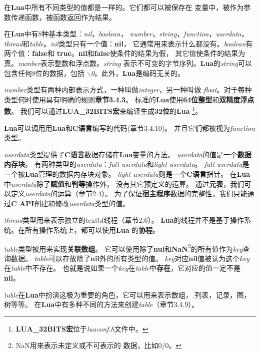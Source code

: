 \documentclass{ctexart}
\begin{document}
在\textbf{Lua}中所有不同类型的值都是一样的。它们都可以被保存在
变量中，被作为参数传递函数，被函数返回作为结果。

在\textbf{Lua}中有8种基本类型：\emph{nil}，\emph{boolean}，
\emph{number}，\emph{string}，\emph{function}，\emph{userdata}，
\emph{thread}和\emph{table}。\emph{nil}类型只有一个值：\textbf{nil}，
它通常用来表示什么都没有。\emph{boolean}有两个值：\textbf{false}和
\textbf{true}。\textbf{nil}和\textbf{false}使条件的结果为假，
其它值使条件的结果为真。\emph{number}表示整数和浮点数。\emph{string}
表示不可变的字节序列。\textbf{Lua}的\emph{string}可以包含任何8位的数据，包括
\emph{$\backslash$0}。此外，\textbf{Lua}是编码无关的。

\emph{number}类型有两种内部表示方式，一种叫做\emph{integer}，另一种叫做
\emph{float}。对于每种类型何时使用具有明确的规则\textbf{章节3.4.3}。
标准的\textbf{Lua}使用\textbf{64位整型}和\textbf{双精度浮点数}。
我们可以通过\textbf{LUA\_32BITS宏}来编译生成\textbf{32位}的\textbf{Lua}
\footnote{\textbf{LUA\_32BITS宏}位于\emph{luaconf.h}文件中。}。

\textbf{Lua}可以调用用\textbf{Lua}和\textbf{C语言}编写的代码(章节3.4.10)。
并且它们都被视为\emph{function}类型。

\emph{userdata}类型提供了\textbf{C语言}数据存储在\textbf{Lua}变量的方法。
\emph{userdata}的值是一个\textbf{数据内存块}。
有两种类型的\emph{userdata}：\emph{full userdata}和\emph{light userdata}。
\emph{full userdata}是一个被\textbf{Lua}管理的数据内存块对象。
\emph{light userdata}则是一个\textbf{C语言}指针。
在\textbf{Lua}中\emph{userdata}除了\textbf{赋值}和\textbf{判等}操作外，
没有其它预定义的运算。
通过\textbf{元表}，我们可以定义\emph{userdata}的运算（章节2.4）。
为了保证\textbf{宿主程序}数据的完整性，我们只能通过\textbf{C API}创建和修改\emph{userdata}类型的值。

\emph{thread}类型用来表示独立的textbf{线程}（章节2.6）。
\textbf{Lua}的线程并不是基于操作系统。在所有操作系统上，都可以使用\textbf{Lua}
的\textbf{协程}。

\emph{table}类型被用来实现\textbf{关联数组}。
它可以使用除了\textbf{nul}和\textbf{NaN}\footnote{NaN用来表示未定义或不可表示的
数据，比如$0/0$。}的所有值作为\emph{key}查询数据。
\emph{table}可以存放除了\textbf{nil}外的所有类型的值。
\emph{key}对应\textbf{nil}值被认为这个\emph{key}在\emph{table}中不存在。
也就是说如果一个\emph{key}在\emph{table}中\textbf{存在}，它对应的值一定不是
\textbf{nil}。

\emph{table}在\textbf{Lua}中扮演这极为重要的角色，它可以用来表示数组，
列表，记录，图，树等等。
在\textbf{Lua}中有多种不同的方法来创建\emph{table}（章节3.4.9）。
\end{document}

